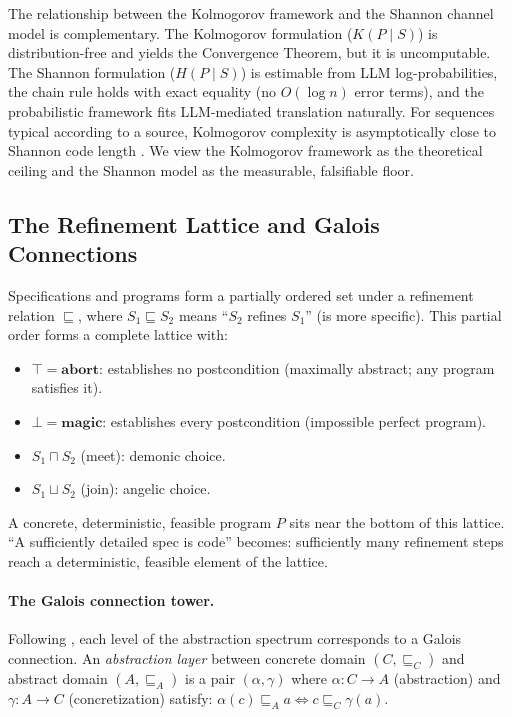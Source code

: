 \documentclass[11pt, a4paper]{googledeepmind}
\begin{document}
The relationship between the Kolmogorov framework and the Shannon channel model is complementary. The Kolmogorov formulation ($K(P \mid S)$) is distribution-free and yields the Convergence Theorem, but it is uncomputable. The Shannon formulation ($H(P \mid S)$) is estimable from LLM log-probabilities, the chain rule holds with exact equality (no $O(\log n)$ error terms), and the probabilistic framework fits LLM-mediated translation naturally. For sequences typical according to a source, Kolmogorov complexity is asymptotically close to Shannon code length \citep{vitanyi2004shannon}. We view the Kolmogorov framework as the theoretical ceiling and the Shannon model as the measurable, falsifiable floor.

\subsection{The Refinement Lattice and Galois Connections}

Specifications and programs form a partially ordered set under a refinement relation $\sqsubseteq$, where $S_1 \sqsubseteq S_2$ means ``$S_2$ refines $S_1$'' (is more specific). This partial order forms a complete lattice \citep{back1980correctness, morgan1994programming} with:

\begin{itemize}[nosep]
    \item $\top = \mathbf{abort}$: establishes no postcondition (maximally abstract; any program satisfies it).
    \item $\bot = \mathbf{magic}$: establishes every postcondition (impossible perfect program).
    \item $S_1 \sqcap S_2$ (meet): demonic choice.
    \item $S_1 \sqcup S_2$ (join): angelic choice.
\end{itemize}

A concrete, deterministic, feasible program $P$ sits near the bottom of this lattice. ``A sufficiently detailed spec is code'' becomes: sufficiently many refinement steps reach a deterministic, feasible element of the lattice.

\paragraph{The Galois connection tower.} Following \citet{cousot1977abstract}, each level of the abstraction spectrum corresponds to a Galois connection. An \emph{abstraction layer} between concrete domain $(C, \sqsubseteq_C)$ and abstract domain $(A, \sqsubseteq_A)$ is a pair $(\alpha, \gamma)$ where $\alpha: C \to A$ (abstraction) and $\gamma: A \to C$ (concretization) satisfy: $\alpha(c) \sqsubseteq_A a \iff c \sqsubseteq_C \gamma(a)$.
\end{document}
